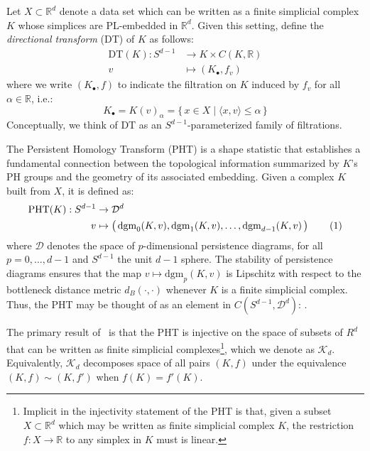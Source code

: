 \documentclass[10pt]{article}
\numberwithin{equation}{section}
\newcommand{\+}{%
	\raisebox{0.18ex}{\scaleobj{0.55}{+}}
}
\theoremstyle{definition}
\theoremstyle{definition}
\newcommand\numberthis{\addtocounter{equation}{1}\tag{\theequation}}
\begin{document}
Let $X \subset \mathbb{R}^d$ denote a data set which can be written as a finite simplicial complex $K$ whose simplices are PL-embedded in $\mathbb{R}^d$. Given this setting,  define the \emph{directional transform} (DT) of $K$ as follows:
\begin{align*}\label{eq:pht}
	\mathrm{DT}(K): S^{d-1} &\to  K \times C(K, \mathbb{R}) \\
	v &\mapsto (K_\bullet, f_v)
\end{align*}
where we write $(K_\bullet, f)$ to indicate the filtration on $K$ induced by $f_v$ for all $\alpha \in \mathbb{R}$, i.e.: 
\begin{equation}
	K_\bullet = K(v)_\alpha = \{\, x \in X \mid \langle x, v \rangle \leq \alpha  \,\} %
\end{equation}
Conceptually, we think of DT as an $S^{d-1}$-parameterized family of filtrations. 


The Persistent Homology Transform (PHT) is a shape statistic that establishes a fundamental connection between the topological information summarized by $K$'s PH groups and the geometry of its associated embedding. Given a complex $K$ built from $X$, it is defined as: 
\begin{align*}\label{eq:pht}
	\mathrm{PHT}(K): S^{d-1} &\to \mathcal{D}^d \\
	v &\mapsto \left( \, \mathrm{dgm}_0(K, v), \mathrm{dgm}_1(K, v), \dots, \mathrm{dgm}_{d-1}(K, v) \, \right)\numberthis
\end{align*}
where $\mathcal{D}$ denotes the space of $p$-dimensional persistence diagrams, for all $p = 0, \dots, d-1$ and $S^{d-1}$ the unit $d-1$ sphere. The stability of persistence diagrams ensures that the map $v \mapsto \mathrm{dgm}_p(K, v)$ is Lipschitz with respect to the bottleneck distance metric $d_B(\cdot, \cdot)$ whenever $K$ is a finite simplicial complex. 
Thus, the PHT may be thought of as an element in $C(S^{d-1}, \mathcal{D}^d)$: . 


The primary result of~\cite{} is that the PHT is injective on the space of subsets of $R^d$ that can be written as finite simplicial complexes\footnote{Implicit in the injectivity statement of the PHT is that, given a subset $X \subset \mathbb{R}^d$ which may be written as finite simplicial complex $K$, the restriction $f: X \to \mathbb{R}$ to any simplex in $K$ must is linear.}, which we denote as $\mathcal{K}_d$. 
Equivalently, $\mathcal{K}_d$ decomposes space of all pairs $(K, f)$ under the equivalence $(K, f) \sim (K,f')$ when $f(K) = f'(K)$.
\end{document}
